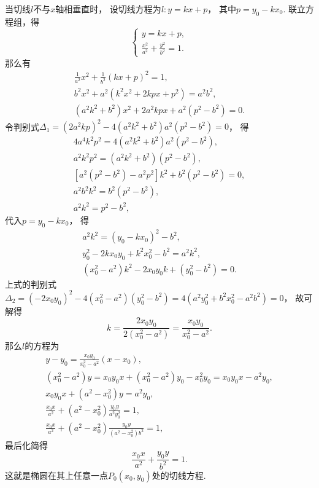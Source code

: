 \begin{example}
\begin{solution}
当切线\(l\)不与\(x\)轴相垂直时，
设切线方程为\(l: y = kx + p\)，
其中\(p = y_0 - k x_0\).
联立方程组，得\begin{equation*}
	\begin{cases}
		y = kx + p, \\
		\frac{x^2}{a^2} + \frac{y^2}{b^2} = 1.
	\end{cases}
\end{equation*}
那么有\begin{gather*}
	\frac{1}{a^2} x^2 + \frac{1}{b^2} (kx+p)^2 = 1, \\
	b^2 x^2 + a^2 (k^2 x^2 + 2kpx + p^2) = a^2 b^2, \\
	(a^2 k^2 + b^2) x^2 + 2 a^2 k p x + a^2 (p^2 - b^2) = 0.
\end{gather*}
令判别式\(
	\Delta_1
	= (2 a^2 k p)^2 - 4 (a^2 k^2 + b^2) a^2 (p^2 - b^2)
	= 0
\)，
得\begin{gather*}
	4 a^4 k^2 p^2 = 4 (a^2 k^2 + b^2) a^2 (p^2 - b^2), \\
	a^2 k^2 p^2 = (a^2 k^2 + b^2)(p^2 - b^2), \\
	[a^2 (p^2 - b^2) - a^2 p^2] k^2 + b^2 (p^2 - b^2) = 0, \\
	a^2 b^2 k^2 = b^2 (p^2 - b^2), \\
	a^2 k^2 = p^2 - b^2,
\end{gather*}
代入\(p = y_0 - k x_0\)，
得\begin{gather*}
	a^2 k^2 = (y_0 - k x_0)^2 - b^2, \\
	y_0^2 - 2k x_0 y_0 + k^2 x_0^2 - b^2 = a^2 k^2, \\
	(x_0^2 - a^2) k^2 - 2 x_0 y_0 k + (y_0^2 - b^2) = 0.
\end{gather*}
上式的判别式\(
	\Delta_2
	= (-2 x_0 y_0)^2 - 4(x_0^2 - a^2)(y_0^2 - b^2)
	= 4(a^2 y_0^2 + b^2 x_0^2 - a^2 b^2)
	= 0
\)，
故可解得\begin{equation*}
	k
	= \frac{2 x_0 y_0}{2 (x_0^2 - a^2)}
	= \frac{x_0 y_0}{x_0^2 - a^2}.
\end{equation*}
那么\(l\)的方程为\begin{gather*}
	y - y_0
	= \frac{x_0 y_0}{x_0^2 - a^2} (x - x_0), \\
	(x_0^2 - a^2) y
	= x_0 y_0 x + (x_0^2 - a^2) y_0 - x_0^2 y_0
	= x_0 y_0 x - a^2 y_0, \\
	x_0 y_0 x + (a^2 - x_0^2) y
	= a^2 y_0, \\
	\frac{x_0 x}{a^2} + (a^2 - x_0^2) \frac{y_0 y}{a^2 y_0^2}
	= 1, \\
	\frac{x_0 x}{a^2} + (a^2 - x_0^2) \frac{y_0 y}{(a^2 - x_0^2) b^2}
	= 1,
\end{gather*}
最后化简得\begin{equation}\label{equation:平面解析几何.椭圆的切线}
	\frac{x_0 x}{a^2} + \frac{y_0 y}{b^2} = 1.
\end{equation}
这就是椭圆在其上任意一点\(P_0(x_0,y_0)\)处的切线方程.
\end{solution}
\end{example}

